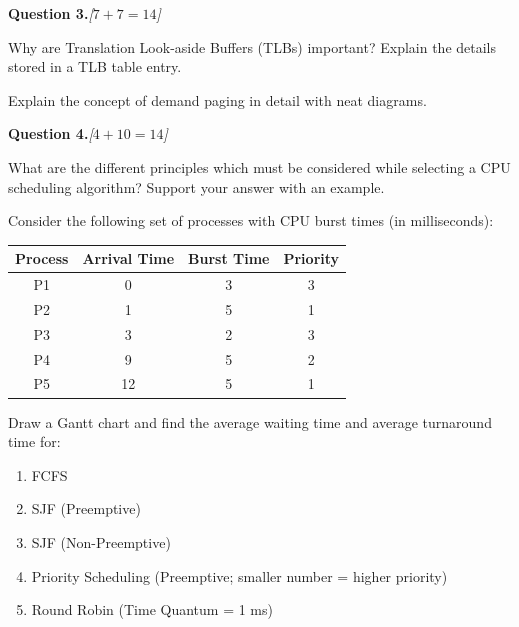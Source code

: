 \documentclass[11pt,a4paper]{article}
\newcommand{\pts}[1]{\hfill   \textit{[#1]}}
\begin{document}
\bigskip




\noindent   \textbf{Question 3.}\pts{$7+7=14$}

\begin{parts}
  \item Why are Translation Look-aside Buffers (TLBs) important? Explain the details stored in a TLB table entry.
  \item Explain the concept of demand paging in detail with neat diagrams.
\end{parts}

\bigskip




\noindent   \textbf{Question 4.}\pts{$4+10=14$}

\begin{parts}
  \item What are the different principles which must be considered while selecting a CPU scheduling algorithm? Support your answer with an example.
  \item Consider the following set of processes with CPU burst times (in milliseconds):

  
\begin{center}
  
\begin{tabular}{|c|c|c|c|}
  \hline
   \textbf{Process} &   \textbf{Arrival Time} &   \textbf{Burst Time} &   \textbf{Priority} \\
  \hline
  P1 & 0  & 3 & 3 \\
  P2 & 1  & 5 & 1 \\
  P3 & 3  & 2 & 3 \\
  P4 & 9  & 5 & 2 \\
  P5 & 12 & 5 & 1 \\
  \hline
  \end{tabular}
  \end{center}

  Draw a Gantt chart and find the average waiting time and average turnaround time for:
  
\begin{enumerate}[label=(\roman*)]
    \item FCFS
    \item SJF (Preemptive)
    \item SJF (Non-Preemptive)
    \item Priority Scheduling (Preemptive; smaller number = higher priority)
    \item Round Robin (Time Quantum = 1 ms)
  \end{enumerate}
\end{parts}
\end{document}
